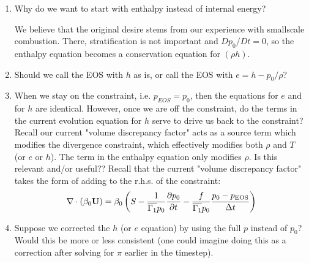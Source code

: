 \begin{enumerate}
\item Why do we want to start with enthalpy instead of internal energy?

   We believe that the original desire stems from our experience with
   smallscale combustion.  There, stratification is not important and
   $Dp_0/Dt = 0$, so the enthalpy equation becomes a conservation
   equation for $(\rho h)$.

\item Should we call the EOS with $h$ as is, or call the EOS with $e =
  h - p_0 / \rho$?

\item When we stay on the constraint, i.e. $p_{EOS} = p_0$, then the
  equations for $e$ and for $h$ are identical.  However, once we are
  off the constraint, do the terms in the current evolution equation
  for $h$ serve to drive us back to the constraint?  Recall our
  current "volume discrepancy factor" acts as a source term which
  modifies the divergence constraint, which effectively modifies both
  $\rho$ and $T$ (or $e$ or $h$).  The term in the enthalpy equation
  only modifies $\rho.$ Is this relevant and/or useful??  Recall that
  the current "volume discrepancy factor" takes the form of adding to
  the r.h.s. of the constraint:
\begin{equation}
\nabla \cdot(\beta_0{\bf U}) = \beta_0\left(S-\frac{1}{\overline{\Gamma_1} p_0}
       \frac{\partial p_0}{\partial t} - \frac{f}{\overline{\Gamma_1} p_0}
       \frac{p_0-p_\text{EOS}}{\Delta t}\right) 
\end{equation}


\item Suppose we corrected the $h$ (or $e$ equation) by using the full
  $p$ instead of $p_0$?  Would this be more or less consistent (one
  could imagine doing this as a correction after solving for $\pi$
  earlier in the timestep).

%
%
%

\end{enumerate}

